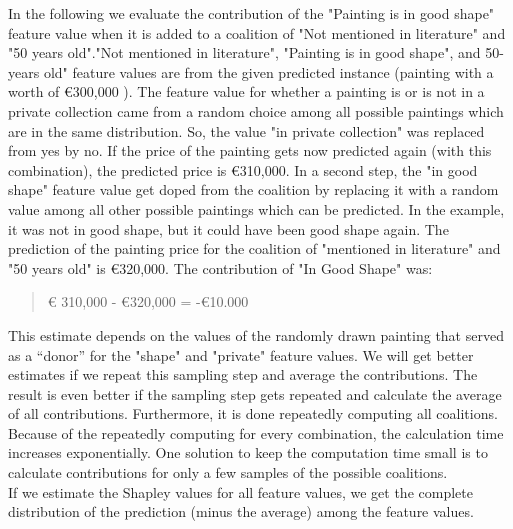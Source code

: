 In the following  we evaluate the contribution of the "Painting is in good shape" feature value when it is added to a coalition of "Not mentioned in literature" and "50 years old"."Not mentioned in literature", "Painting is in good shape", and 50-years old" feature values are from the given predicted instance (painting with a worth of €300,000 ). The feature value for whether a painting is or is not in a private collection came from a random choice among all possible paintings which are in the same distribution. So, the value "in private collection" was replaced from yes by no. If the price of the painting gets now predicted again (with this combination), the predicted price is €310,000. In a second step, the "in good shape" feature value get doped from the coalition by replacing it with a random value among all other possible paintings which can be predicted. In the example, it was not in good shape, but it could have been good shape again. The prediction of the painting price for the coalition of "mentioned in literature" and "50 years old" is €320,000. The contribution of "In Good Shape" was:

\begin{quote}
	\centering
	€ 310,000 - €320,000 = -€10.000
\end{quote} 

This estimate depends on the values of the randomly drawn painting that served as a “donor” for the "shape" and "private" feature values. We will get better estimates if we repeat this sampling step and average the contributions. The result is even better if the sampling step gets repeated and calculate the average of all contributions. Furthermore, it is done repeatedly computing all coalitions. Because of the repeatedly computing for every combination, the calculation time increases exponentially. One solution to keep the computation time small is to calculate contributions for only a few samples of the possible coalitions.\\

If we estimate the Shapley values for all feature values, we get the complete distribution of the prediction (minus the average) among the feature values.

